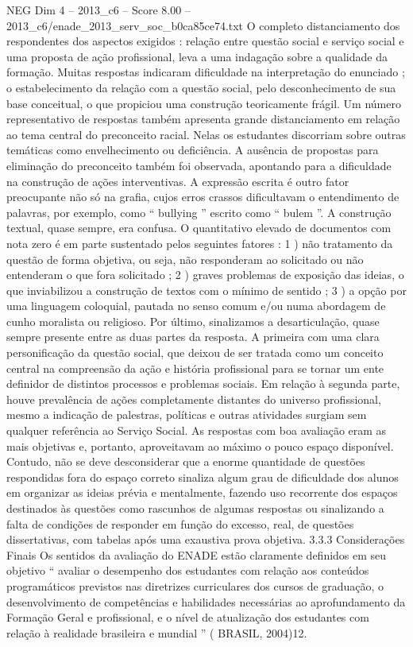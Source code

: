 \begin{textsample}{NEG Dim 4 – 2013\_c6 – Score 8.00 – 2013\_c6/enade\_2013\_serv\_soc\_b0ca85ce74.txt}
O completo distanciamento dos respondentes dos aspectos exigidos : relação entre questão social e serviço social e uma proposta de ação profissional, leva a uma indagação sobre a qualidade da formação.
Muitas respostas indicaram dificuldade na interpretação do enunciado ; o estabelecimento da relação com a questão social, pelo desconhecimento de sua base conceitual, o que propiciou uma construção teoricamente frágil.
Um número representativo de respostas também apresenta grande distanciamento em relação ao tema central do preconceito racial.
Nelas os estudantes discorriam sobre outras temáticas como envelhecimento ou deficiência.
A ausência de propostas para eliminação do preconceito também foi observada, apontando para a dificuldade na construção de ações interventivas.
A expressão escrita é outro fator preocupante não só na grafia, cujos erros crassos dificultavam o entendimento de palavras, por exemplo, como “ bullying ” escrito como “ bulem ”.
A construção textual, quase sempre, era confusa.
O quantitativo elevado de documentos com nota zero é em parte sustentado pelos seguintes fatores : 1 ) não tratamento da questão de forma objetiva, ou seja, não responderam ao solicitado ou não entenderam o que fora solicitado ; 2 ) graves problemas de exposição das ideias, o que inviabilizou a construção de textos com o mínimo de sentido ; 3 ) a opção por uma linguagem coloquial, pautada no senso comum e/ou numa abordagem de cunho moralista ou religioso.
Por último, sinalizamos a desarticulação, quase sempre presente entre as duas partes da resposta.
A primeira com uma clara personificação da questão social, que deixou de ser tratada como um conceito central na compreensão da ação e história profissional para se tornar um ente definidor de distintos processos e problemas sociais.
Em relação à segunda parte, houve prevalência de ações completamente distantes do universo profissional, mesmo a indicação de palestras, políticas e outras atividades surgiam sem qualquer referência ao Serviço Social.
As respostas com boa avaliação eram as mais objetivas e, portanto, aproveitavam ao máximo o pouco espaço disponível.
Contudo, não se deve desconsiderar que a enorme quantidade de questões respondidas fora do espaço correto sinaliza algum grau de dificuldade dos alunos em organizar as ideias prévia e mentalmente, fazendo uso recorrente dos espaços destinados às questões como rascunhos de algumas respostas ou sinalizando a falta de condições de responder em função do excesso, real, de questões dissertativas, com tabelas após uma exaustiva prova objetiva. 3.3.3 Considerações Finais Os sentidos da avaliação do ENADE estão claramente definidos em seu objetivo “ avaliar o desempenho dos estudantes com relação aos conteúdos programáticos previstos nas diretrizes curriculares dos cursos de graduação, o desenvolvimento de competências e habilidades necessárias ao aprofundamento da Formação Geral e profissional, e o nível de atualização dos estudantes com relação à realidade brasileira e mundial ” ( BRASIL, 2004)12.

\end{textsample}
